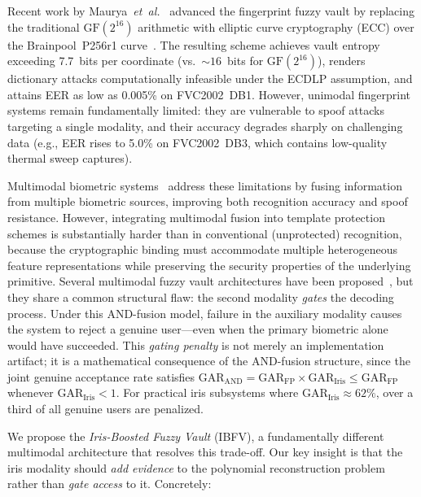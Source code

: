 \documentclass[3p,twocolumn]{elsarticle}
\newcommand{\IBFV}{\textsf{IBFV}}
\newcommand{\GAR}{\mathrm{GAR}}
\begin{document}
Recent work by Maurya~\textit{et~al.}~\cite{maurya2025enhancing} advanced the fingerprint fuzzy vault by replacing the traditional $\text{GF}(2^{16})$ arithmetic with elliptic curve cryptography (ECC) over the Brainpool~P256r1 curve~\cite{rfc5639}. The resulting scheme achieves vault entropy exceeding 7.7~bits per coordinate (vs.\ $\sim\!16$~bits for $\text{GF}(2^{16})$), renders dictionary attacks computationally infeasible under the ECDLP assumption, and attains EER as low as 0.005\% on FVC2002~DB1. However, unimodal fingerprint systems remain fundamentally limited: they are vulnerable to spoof attacks targeting a single modality, and their accuracy degrades sharply on challenging data (e.g., EER rises to 5.0\% on FVC2002~DB3, which contains low-quality thermal sweep captures).

Multimodal biometric systems~\cite{ross2003information,jain2004multibiometrics} address these limitations by fusing information from multiple biometric sources, improving both recognition accuracy and spoof resistance. However, integrating multimodal fusion into template protection schemes is substantially harder than in conventional (unprotected) recognition, because the cryptographic binding must accommodate multiple heterogeneous feature representations while preserving the security properties of the underlying primitive. Several multimodal fuzzy vault architectures have been proposed~\cite{nandakumar2008multibiometric,moon2010multibiometric}, but they share a common structural flaw: the second modality \emph{gates} the decoding process. Under this AND-fusion model, failure in the auxiliary modality causes the system to reject a genuine user---even when the primary biometric alone would have succeeded. This \emph{gating penalty} is not merely an implementation artifact; it is a mathematical consequence of the AND-fusion structure, since the joint genuine acceptance rate satisfies $\GAR_{\text{AND}} = \GAR_{\text{FP}} \times \GAR_{\text{Iris}} \leq \GAR_{\text{FP}}$ whenever $\GAR_{\text{Iris}} < 1$. For practical iris subsystems where $\GAR_{\text{Iris}} \approx 62\%$, over a third of all genuine users are penalized.

We propose the \emph{Iris-Boosted Fuzzy Vault} (\IBFV{}), a fundamentally different multimodal architecture that resolves this trade-off. Our key insight is that the iris modality should \emph{add evidence} to the polynomial reconstruction problem rather than \emph{gate access} to it. Concretely:
\end{document}
